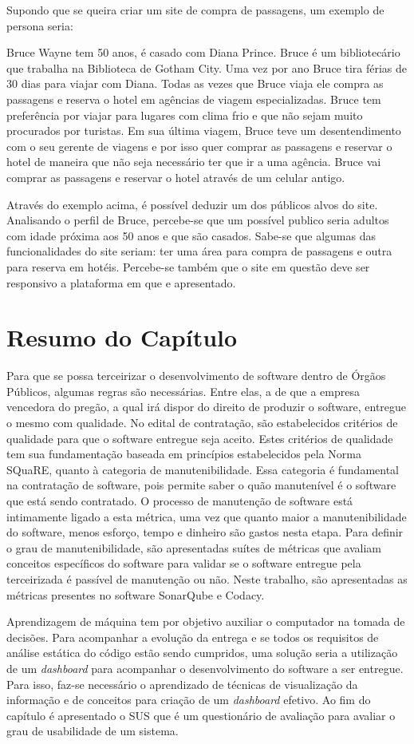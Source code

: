 Supondo que se queira criar um site de compra de passagens, um exemplo de persona seria: 

Bruce Wayne tem 50 anos, é casado com Diana Prince. Bruce é  um bibliotecário que trabalha na Biblioteca de Gotham City. Uma vez por ano Bruce tira férias de 30 dias para viajar com Diana. Todas as vezes que Bruce viaja ele compra as passagens e reserva o hotel em agências de viagem especializadas. Bruce tem preferência por viajar para lugares com clima frio e que não sejam muito procurados por turistas. Em sua última viagem, Bruce teve um desentendimento com o seu gerente de viagens e por isso quer comprar as passagens e reservar o hotel de maneira que não seja necessário ter que ir a uma agência. Bruce vai comprar as passagens e reservar o hotel através de um celular antigo.

Através do exemplo acima, é possível deduzir um dos públicos alvos do site. Analisando o perfil de Bruce, percebe-se que um possível publico seria adultos com idade próxima aos 50 anos e que são casados. Sabe-se que algumas das funcionalidades do site seriam: ter uma área para compra de passagens e outra para reserva em hotéis. Percebe-se também que o site em questão deve ser responsivo a plataforma em que e apresentado.  


\section{Resumo do Capítulo}

Para que se possa terceirizar o desenvolvimento de software dentro de Órgãos Públicos, algumas regras são necessárias. Entre elas, a de que a empresa vencedora do pregão, a qual irá dispor do direito de produzir o software, entregue o mesmo com qualidade. No edital de contratação, são estabelecidos critérios de qualidade para que o software entregue seja aceito. Estes critérios de qualidade tem sua fundamentação baseada em princípios estabelecidos pela Norma SQuaRE, quanto à categoria de manutenibilidade. Essa categoria é fundamental na contratação de software, pois permite saber o quão manutenível é o software que está sendo contratado. O processo de manutenção de software está intimamente ligado a esta métrica, uma vez que quanto maior a manutenibilidade do software, menos esforço, tempo e dinheiro são gastos nesta etapa. Para definir o grau de manutenibilidade, são apresentadas suítes de métricas que avaliam conceitos específicos do software para validar se o software entregue pela terceirizada é passível de manutenção ou não. Neste trabalho, são apresentadas as métricas presentes no software SonarQube e Codacy. 

Aprendizagem de máquina tem por objetivo auxiliar o computador na tomada de decisões. Para acompanhar a evolução da entrega e se todos os requisitos de análise estática do código estão sendo cumpridos, uma solução seria a utilização de um \textit{dashboard} para acompanhar o desenvolvimento do software a ser entregue. Para isso, faz-se necessário o aprendizado de técnicas de visualização da informação e de conceitos para criação de um \textit{dashboard} efetivo. Ao fim do capítulo é apresentado o SUS que é um questionário de avaliação para avaliar o grau de usabilidade de um sistema.